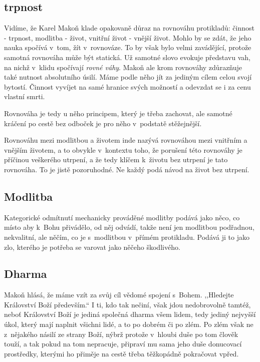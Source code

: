 \subsection{trpnost}

Vidíme, že Karel Makoň klade opakovaně důraz na rovnováhu protikladů:
činnost - trpnost,
modlitba - život,
vnitřní život - vnější život.
Mohlo by se zdát, že jeho nauka spočívá v~tom, žít v~rovnováze. To by však bylo
velmi zavádějící, protože samotná rovnováha může být statická. Už samotné slovo
evokuje představu vah, na nichž v~klidu spočívají \textit{rovné váhy}. Makoň ale
krom rovnováhy zdůrazňuje také nutnost absolutního úsilí. Máme podle něho jít za
jediným cílem celou svojí bytostí. Činnost vyvíjet na samé hranice svých
možností a odevzdat se i za cenu vlastní smrti.

Rovnováha je tedy u něho principem, který je třeba zachovat, ale samotné kráčení
po cestě bez odboček je pro něho v~podstatě stěžejnější.

Rovnováhu mezi modlitbou a životem inde nazývá rovnováhou mezi vnitřním
a vnějším životem, a to obvykle v~kontextu toho, že porušení této rovnováhy je
příčinou veškerého utrpení, a že tedy klíčem k~životu bez utrpení je tato
rovnováha. To je jistě pozoruhodné. Ne každý podá návod na život bez utrpení.

\subsection{Modlitba}

Kategorické odmítnutí
mechanicky prováděné modlitby podává jako něco, co místo aby k~Bohu přivádělo, od něj
odvádí, takže není jen modlitbou podřadnou, nekvalitní, ale něčím, co je
s~modlitbou v~přímém protikladu. Podává ji to jako zlo, kterého je potřeba se
varovat jako něčeho škodlivého.

\subsection{Dharma}

Makoň hlásá, že máme vzít za svůj cíl vědomé spojení s~Bohem. ,,Hledejte
Království Boží především.`` I ti, kdo tak nečiní, však jdou nedobrovolně
tamtéž, neboť Království Boží je jediná společná dharma všem lidem, tedy jediný
nejvyšší úkol, který mají naplnit všichni lidé, a to po dobrém či po zlém. Po
zlém však ne z~nějakého násilí ze strany Boží, nýbrž protože v~hloubi duše po
tom člověk touží, a tak pokud na tom nepracuje, připraví mu sama jeho duše
donucovací prostředky, kterými ho přiměje na cestě třeba těžkopádně pokračovat
vpřed.
